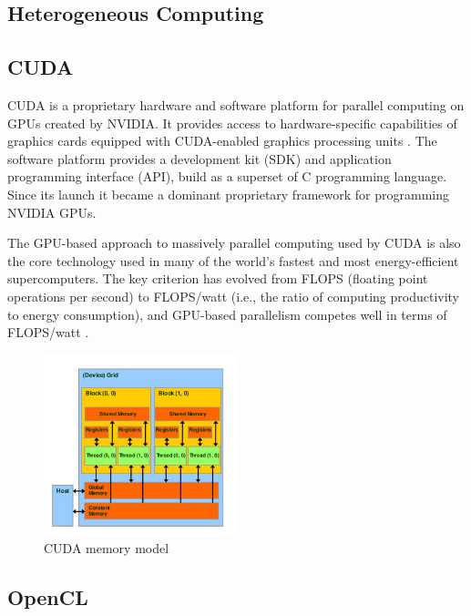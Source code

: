 \subsection{Heterogeneous Computing}

\subsection{CUDA}

CUDA is a proprietary hardware and software platform for parallel computing on GPUs created by NVIDIA. It provides access to hardware-specific capabilities of graphics cards equipped with CUDA-enabled graphics processing units \cite{stortiCUDAEngineersIntroduction2016}. The software platform provides a development kit (SDK) and application programming interface (API), build as a superset of C programming language. Since its launch it became a dominant proprietary framework for programming NVIDIA GPUs.

The GPU-based approach to massively parallel computing used by CUDA is also the core technology used in many of the world’s fastest and most energy-efficient supercomputers. The key criterion has evolved from FLOPS (floating point operations per second) to FLOPS/watt (i.e., the ratio of computing productivity to energy consumption), and GPU-based parallelism competes well in terms of FLOPS/watt \citep{stortiCUDAEngineersIntroduction2016}.

\begin{figure}[!ht]
	\centering
	\includegraphics[width=0.5\textwidth]{figures/cuda-device-memory.jpg}
	\caption{CUDA memory model}
	\label{fig:cuda-memory-model}
\end{figure}

\subsection{OpenCL}

